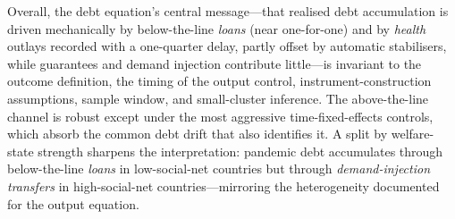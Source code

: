 Overall, the debt equation's central message---that realised debt accumulation
is driven mechanically by below-the-line \emph{loans} (near one-for-one) and by
\emph{health} outlays recorded with a one-quarter delay, partly offset by
automatic stabilisers, while guarantees and demand injection contribute
little---is invariant to the outcome definition, the timing of the output
control, instrument-construction assumptions, sample window, and small-cluster
inference. The above-the-line channel is robust except under the most
aggressive time-fixed-effects controls, which absorb the common debt drift that
also identifies it. A split by welfare-state strength sharpens the
interpretation: pandemic debt accumulates through below-the-line \emph{loans}
in low-social-net countries but through \emph{demand-injection transfers} in
high-social-net countries---mirroring the heterogeneity documented for the
output equation.
